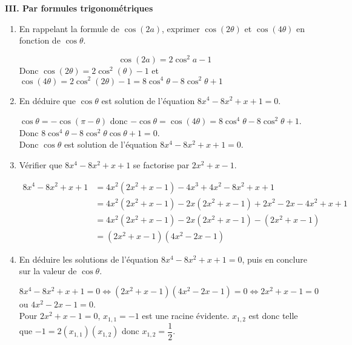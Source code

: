 \documentclass[a4paper,french,bookmarks]{article}
\begin{document}
\noindent\textbf{III. Par formules trigonométriques}
\begin{enumerate}
    \item En rappelant la formule de $\cos(2a)$, exprimer $\cos(2\theta)$ et $\cos(4\theta)$ en fonction de $\cos \theta$.
        \begin{tcolorbox}[colback=black!8,colframe=black!9,boxrule=.25pt,enhanced,arc is angular,arc=0pt]
        \[\cos(2a) = 2\cos^2 a - 1\]
        Donc \quad $\cos(2\theta) = 2\cos^2(\theta) - 1$ \qquad et \qquad $\cos(4\theta) = 2\cos^2(2\theta)-1=8\cos^4\theta-8\cos^2\theta + 1$
        \end{tcolorbox}
    \item En déduire que $\cos \theta$ est solution de l'équation $8x^4-8x^2+x+1=0$.
        \begin{tcolorbox}[colback=black!8,colframe=black!9,boxrule=.25pt,enhanced,arc is angular,arc=0pt]
        $\cos \theta = - \cos(\pi - \theta)$ donc $-\cos \theta = \cos (4\theta) = 8\cos^4\theta-8\cos^2\theta + 1$.
        Donc $8\cos^4\theta-8\cos^2\theta \cos \theta + 1 = 0$.\\
        Donc $\cos \theta$ est solution de l'équation $8x^4-8x^2+x+1=0$.
        \end{tcolorbox}
    \item Vérifier que $8x^4-8x^2+x+1$ se factorise par $2x^2+x-1$.
    \begin{tcolorbox}[colback=black!8,colframe=black!9,boxrule=.25pt,enhanced,arc is angular,arc=0pt]
    \begin{align*}
        8x^4-8x^2+x+1 &= 4x^2(2x^2+x-1) -4x^3 + 4x^2 - 8x^2 + x + 1 \\
        &= 4x^2(2x^2+x-1) -2x(2x^2+x-1) + 2x^2 - 2x - 4x^2 + x + 1\\
        &=4x^2(2x^2+x-1) -2x(2x^2+x-1) -(2x^2 +x - 1)\\
        &=(2x^2+x-1)(4x^2-2x-1)
    \end{align*}
    \end{tcolorbox}
    \item En déduire les solutions de l'équation $8x^4-8x^2+x+1=0$, puis en conclure sur la valeur de $\cos \theta$.
    \begin{tcolorbox}[colback=black!8,colframe=black!9,boxrule=.25pt,enhanced,arc is angular,arc=0pt]
    $8x^4-8x^2+x+1=0 \iff (2x^2+x-1)(4x^2-2x-1) = 0 \iff 2x^2+x-1 = 0 $ ou $4x^2-2x-1 = 0$.\\
    Pour $2x^2+x-1=0$, $x_{1,1} = -1$ est une racine évidente. $x_{1,2}$ est donc telle que $-1=2(x_{1,1})(x_{1,2})$ donc $x_{1,2}=\dfrac{1}{2}$.\\
    

\end{tcolorbox}
\end{enumerate}
\end{document}
